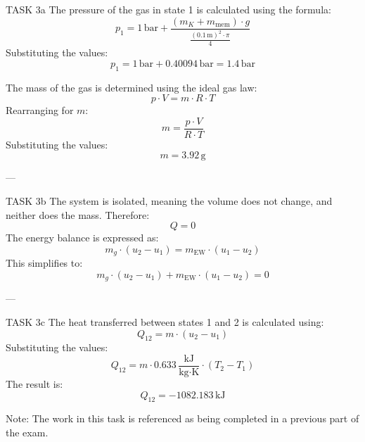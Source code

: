 TASK 3a  
The pressure of the gas in state 1 is calculated using the formula:  
\[
p_1 = 1 \, \text{bar} + \frac{(m_K + m_{\text{mem}}) \cdot g}{\frac{(0.1 \, \text{m})^2 \cdot \pi}{4}}
\]  
Substituting the values:  
\[
p_1 = 1 \, \text{bar} + 0.40094 \, \text{bar} = 1.4 \, \text{bar}
\]  

The mass of the gas is determined using the ideal gas law:  
\[
p \cdot V = m \cdot R \cdot T
\]  
Rearranging for \( m \):  
\[
m = \frac{p \cdot V}{R \cdot T}
\]  
Substituting the values:  
\[
m = 3.92 \, \text{g}
\]  

---

TASK 3b  
The system is isolated, meaning the volume does not change, and neither does the mass. Therefore:  
\[
Q = 0
\]  
The energy balance is expressed as:  
\[
m_g \cdot (u_2 - u_1) = m_{\text{EW}} \cdot (u_1 - u_2)
\]  
This simplifies to:  
\[
m_g \cdot (u_2 - u_1) + m_{\text{EW}} \cdot (u_1 - u_2) = 0
\]  

---

TASK 3c  
The heat transferred between states 1 and 2 is calculated using:  
\[
Q_{12} = m \cdot (u_2 - u_1)
\]  
Substituting the values:  
\[
Q_{12} = m \cdot 0.633 \, \frac{\text{kJ}}{\text{kg·K}} \cdot (T_2 - T_1)
\]  
The result is:  
\[
Q_{12} = -1082.183 \, \text{kJ}
\]  

Note: The work in this task is referenced as being completed in a previous part of the exam.